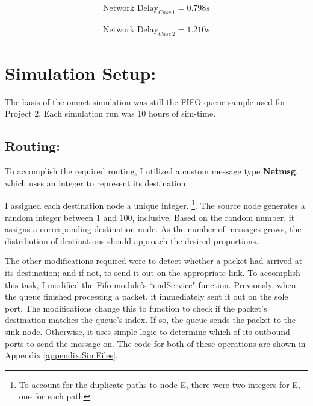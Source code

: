 \documentclass{article}
\begin{document}
\begin{minipage}{0.5\textwidth}
\begin{align*}
\text{Network Delay}_{Case \, 1} = 0.798s
\end{align*}
\end{minipage}
\begin{minipage}{0.5\textwidth}
\begin{align*}
\text{Network Delay}_{Case \, 2} = 1.210s
\end{align*}
\end{minipage}
\newline 

\newpage
\section{Simulation Setup:}
\label{sec:SimSetup}

The basis of the omnet simulation was still the FIFO queue sample used for Project 2.
Each simulation run was 10 hours of sim-time.

\subsection{Routing:}
\label{subsec:RoutingSetup}
To accomplish the required routing, I utilized a custom message type \textbf{Netmsg}, which uses an integer to represent its destination.

I assigned each destination node a unique integer. \footnote{To account for the duplicate paths to node E, there were two integers for E, one for each path}.
The source node generates a random integer between 1 and 100, inclusive.  Based on the random number, it assigns a corresponding destination node.
As the number of messages grows, the distribution of destinations should approach the desired proportions.

The other modifications required were to detect whether a packet had arrived at its destination; and if not, to send it out on the appropriate link.
To accomplish this task, I modified the Fifo module's ``endService" function.
Previously, when the queue finished processing a packet, it immediately sent it out on the sole port.
The modifications change this to function to check if the packet's destination matches the queue's index.  
If so, the queue sends the packet to the sink node.
Otherwise, it uses simple logic to determine which of its outbound ports to send the message on.
The code for both of these operations are shown in Appendix \ref{appendix:SimFiles}.
\end{document}
